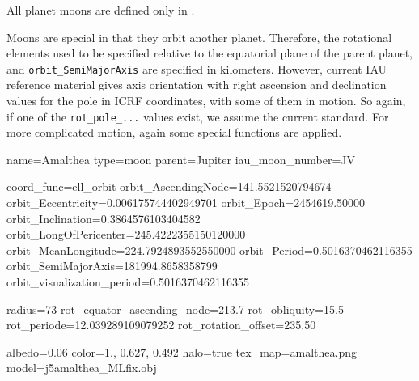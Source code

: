 All planet moons are defined only in .

Moons are special in that they orbit another planet. Therefore, the
rotational elements used to be specified relative to the equatorial plane of the
parent planet, and \texttt{orbit\_SemiMajorAxis} are specified in kilometers. 
However, current IAU reference material gives axis orientation
with right ascension and declination values for the pole in ICRF
coordinates, with some of them in motion. So again, if one of the
\texttt{rot\_pole\_...} values exist, we assume the current
standard. For more complicated motion, again some special functions
are applied.


\begin{configfile}
[amalthea]
name=Amalthea
type=moon
parent=Jupiter
iau_moon_number=JV

coord_func=ell_orbit
orbit_AscendingNode=141.5521520794674
orbit_Eccentricity=0.006175744402949701
orbit_Epoch=2454619.50000
orbit_Inclination=0.3864576103404582
orbit_LongOfPericenter=245.4222355150120000
orbit_MeanLongitude=224.7924893552550000
orbit_Period=0.5016370462116355
orbit_SemiMajorAxis=181994.8658358799
orbit_visualization_period=0.5016370462116355

radius=73
rot_equator_ascending_node=213.7
rot_obliquity=15.5
rot_periode=12.039289109079252
rot_rotation_offset=235.50

albedo=0.06
color=1., 0.627, 0.492
halo=true
tex_map=amalthea.png
model=j5amalthea_MLfix.obj
\end{configfile}

